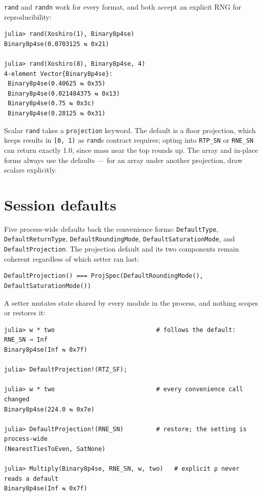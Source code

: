 \label{13027969696381432085}{}


\texttt{rand} and \texttt{randn} work for every format, and both accept an explicit RNG for reproducibility:




\begin{verbatim}
julia> rand(Xoshiro(1), Binary8p4se)
Binary8p4se(0.0703125 ⇆ 0x21)

julia> rand(Xoshiro(8), Binary8p4se, 4)
4-element Vector{Binary8p4se}:
 Binary8p4se(0.40625 ⇆ 0x35)
 Binary8p4se(0.021484375 ⇆ 0x13)
 Binary8p4se(0.75 ⇆ 0x3c)
 Binary8p4se(0.28125 ⇆ 0x31)
\end{verbatim}



Scalar \texttt{rand} takes a \texttt{projection} keyword. The default is a floor projection, which keeps results in \texttt{[0, 1)} as \texttt{rand}{\textquotesingle}s contract requires; opting into \texttt{RTP\_SN} or \texttt{RNE\_SN} can return exactly 1.0, since mass near the top rounds up. The array and in-place forms always use the defaults — for an array under another projection, draw scalars explicitly.



\section{Session defaults}



\label{3970345369238056532}{}


Five process-wide defaults back the convenience forms: \texttt{DefaultType}, \texttt{DefaultReturnType}, \texttt{DefaultRoundingMode}, \texttt{DefaultSaturationMode}, and \texttt{DefaultProjection}. The projection default and its two components remain coherent regardless of which setter ran last:




\begin{verbatim}
DefaultProjection() === ProjSpec(DefaultRoundingMode(), DefaultSaturationMode())
\end{verbatim}



A setter mutates state shared by every module in the process, and nothing scopes or restores it:




\begin{verbatim}
julia> w * two                            # follows the default: RNE_SN → Inf
Binary8p4se(Inf ⇆ 0x7f)

julia> DefaultProjection!(RTZ_SF);

julia> w * two                            # every convenience call changed
Binary8p4se(224.0 ⇆ 0x7e)

julia> DefaultProjection!(RNE_SN)         # restore; the setting is process-wide
(NearestTiesToEven, SatNone)

julia> Multiply(Binary8p4se, RNE_SN, w, two)   # explicit ρ never reads a default
Binary8p4se(Inf ⇆ 0x7f)
\end{verbatim}



